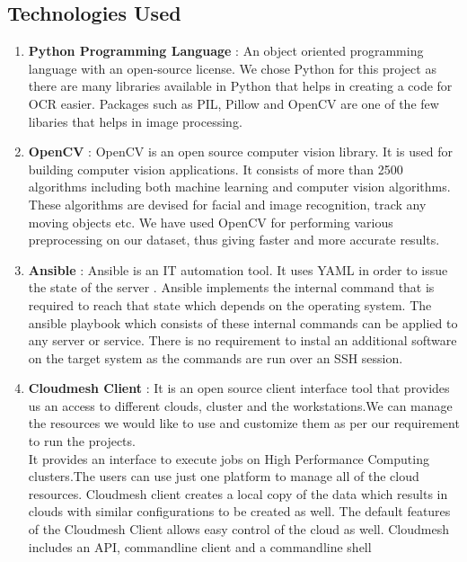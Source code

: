 \documentclass[9pt,twocolumn,twoside]{../../styles/osajnl}
\begin{document}
\subsection{Technologies Used}
\begin{enumerate}
  \item {\bfseries Python Programming Language} : An object oriented
  programming language with an open-source license. We chose Python for
  this project as there are many libraries available in Python that
  helps in creating a code for OCR easier. Packages such as PIL,
  Pillow and OpenCV are one of the few libaries that helps in image
  processing.
\item{\bfseries OpenCV } : OpenCV is an open source computer vision
  library.  It is used for building computer vision applications. It
  consists of more than 2500 algorithms including both machine
  learning and computer vision algorithms. These algorithms are
  devised for facial and image recognition, track any moving objects
  etc. We have used OpenCV for performing various preprocessing on our
  dataset, thus giving faster and more accurate results.
  
  \item{\bfseries Ansible} : Ansible is an IT automation tool. It uses
    YAML in order to issue the state of the server
    \cite{www-ocr}. Ansible implements the internal command that is
    required to reach that state which depends on the operating
    system. The ansible playbook which consists of these internal
    commands can be applied to any server or service. There is no
    requirement to instal an additional software on the target system
    as the commands are run over an SSH session.
  \item{\bfseries Cloudmesh Client} : It is an open source client
    interface tool that provides us an access to different clouds,
    cluster and the workstations.We can manage the resources we would
    like to use and customize them as per our requirement to run the
    projects.\\ It provides an interface to execute jobs on High
    Performance Computing clusters\cite{cloudmesh}.The users can use
    just one platform to manage all of the cloud resources. Cloudmesh
    client creates a local copy of the data which results in clouds
    with similar configurations to be created as well.  The default
    features of the Cloudmesh Client allows easy control of the cloud
    as well. Cloudmesh includes an API, commandline client and a
    commandline shell


\end{enumerate}
\end{document}
